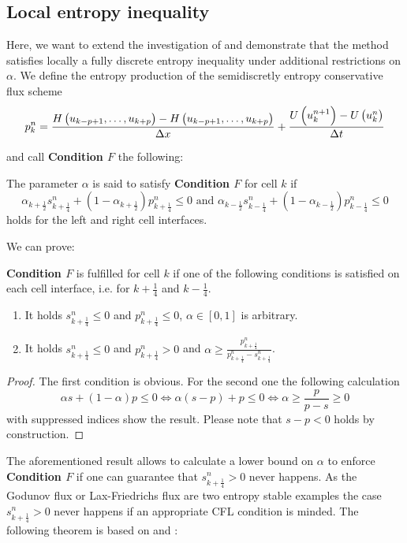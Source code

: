\subsection{Local entropy inequality}\label{subsec_local_entropy}
Here, we want to extend the investigation of  \cite{klein2021using} and demonstrate that the method satisfies locally a fully discrete entropy inequality 
%
under additional restrictions on $\alpha$. We  define the entropy production of the semidiscretly entropy conservative flux scheme
\[
	p^n_k = \frac{H\left (u_{k - p+1}, \dots, u_{k+p} \right) - H\left (u_{k-p+1}, \dots,  u_{k+p} \right)}{\Delta x} + \frac{U\left (u^{n+1}_k \right) - U \left (u^n_k \right)}{\Delta t}
\] 

and call  \textbf{Condition $F$}  the following:
\begin{definition}
	The parameter $\alpha$ is said to satisfy \textbf{Condition $F$} for cell $k$ if
\[
	\alpha_{k+\frac 1 2} s^n_{k + \frac 1 4} + \left(1-\alpha_{k + \frac 1 2}\right) p^n_{k + \frac 1 4} \leq 0 \text{ and }  \alpha_{k-\frac 1 2} s^n_{k - \frac 1 4} + \left(1-\alpha_{k - \frac 1 2}\right) p^n_{k - \frac 1 4} \leq 0
\]
	holds for the left and right cell interfaces.
\end{definition}
We can prove: 
\begin{lemma}\label{lem:EalpBound}
	\textbf{Condition $F$} is fulfilled for cell $k$ if one of the following conditions is satisfied on each cell interface, i.e. for $k+\frac 1 4$ and $k-\frac 1 4$.
	\begin{enumerate}
		\item It holds $s^n_{k+\frac 1 4} \leq 0$ and $p^n_{k+\frac 1 4} \leq 0$, $\alpha \in [0, 1]$ is arbitrary.
		\item It holds $s^n_{k + \frac 1 4} \leq 0$ and $p^n_{k + \frac 1 4} > 0$ and $\alpha \geq \frac{p^n_{k+\frac 1 4}}{p^n_{k + \frac 1 4} - s^n_{k + \frac 1 4}}$.
	\end{enumerate}
	\begin{proof}
		The first condition is obvious. For the second one the following calculation
		\[
			\alpha s + (1-\alpha) p \leq 0 \iff \alpha(s-p) + p \leq 0 \iff  \alpha \geq \frac{p}{p-s} \geq 0
		\]
		with suppressed indices show the result. Please note that $s-p < 0$ holds by construction.
		\end{proof}
	\end{lemma}
	The aforementioned result allows to calculate a lower bound on $\alpha$ to enforce  \textbf{Condition $F$} if one can guarantee that $s^n_{k+\frac 1 4} > 0$ never happens. As the Godunov flux or Lax-Friedrichs flux are two entropy stable examples  the case $s^n_{k + \frac 1 4}>0$ never happens if an appropriate CFL condition is minded. The following theorem is based on \cite{Tadmor84II} and \cite{klein2021using}:
